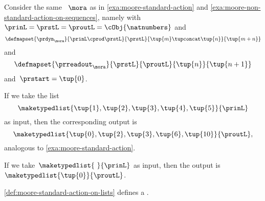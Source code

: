 \begin{example}
    \label{exa:moore-non-standard-action-on-lists}
    Consider the same ~$\mora$ as in \cref{exa:moore-standard-action} and \cref{exa:moore-non-standard-action-on-sequences}, namely with~$\prinL = \prstL = \proutL = \cObj{\natnumbers}$
    and
    \begin{equation}
        \defmapset{
            \prdyn_\mora
        }{
            \prinL \cprod \prstL
        }{
            \prstL
        }{
            \tup{m} \tupconcat \tup{n}
        }{
            \tup{m + n}
        }
    \end{equation}
    and
    \begin{equation}
        \defmapset{
            \prreadout_\mora
        }{
            \prstL
        }{
            \proutL
        }{
            \tup{n}
        }{
            \tup{n+1}
        }
    \end{equation}
    and~$\prstart = \tup{0}$.

    If we take the list
    \begin{equation}
        \maketypedlist{\tup{1}, \tup{2}, \tup{3}, \tup{4}, \tup{5}}{\prinL}
    \end{equation}
    as input, then the corresponding output is
    \begin{equation}
        \maketypedlist{\tup{0}, \tup{2}, \tup{3}, \tup{6}, \tup{10}}{\proutL},
    \end{equation}
    analogous to \cref{exa:moore-standard-action}.

    If we take~$\maketypedlist{\ }{\prinL}$ as input, then the output is~$\maketypedlist{\tup{0}}{\proutL}$.
\end{example}


\begin{lemma}\label{lem:moore-standard-action-on-lists}
    \cref{def:moore-standard-action-on-lists} defines a .
\end{lemma}

